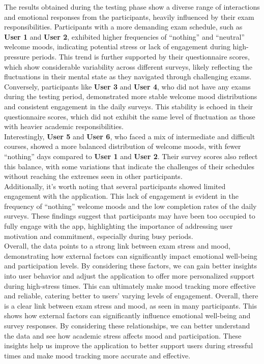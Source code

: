 The results obtained during the testing phase show a diverse range of interactions and emotional responses from the participants, heavily influenced by their exam responsibilities. Participants with a more demanding exam schedule, such as \textbf{User 1} and \textbf{User 2}, exhibited higher frequencies of ``nothing'' and ``neutral'' welcome moods, indicating potential stress or lack of engagement during high-pressure periods. This trend is further supported by their questionnaire scores, which show considerable variability across different surveys, likely reflecting the fluctuations in their mental state as they navigated through challenging exams.\vspace{5mm} \\
Conversely, participants like \textbf{User 3} and \textbf{User 4}, who did not have any exams during the testing period, demonstrated more stable welcome mood distributions and consistent engagement in the daily surveys. This stability is echoed in their questionnaire scores, which did not exhibit the same level of fluctuation as those with heavier academic responsibilities.\vspace{5mm} \\
Interestingly, \textbf{User 5} and \textbf{User 6}, who faced a mix of intermediate and difficult courses, showed a more balanced distribution of welcome moods, with fewer ``nothing'' days compared to \textbf{User 1} and \textbf{User 2}. Their survey scores also reflect this balance, with some variations that indicate the challenges of their schedules without reaching the extremes seen in other participants.\vspace{5mm} \\
Additionally, it’s worth noting that several participants showed limited engagement with the application. This lack of engagement is evident in the frequency of “nothing” welcome moods and the low completion rates of the daily surveys. These findings suggest that participants may have been too occupied to fully engage with the app, highlighting the importance of addressing user motivation and commitment, especially during busy periods.\vspace{5mm} \\
Overall, the data points to a strong link between exam stress and mood, demonstrating how external factors can significantly impact emotional well-being and participation levels. By considering these factors, we can gain better insights into user behavior and adjust the application to offer more personalized support during high-stress times. This can ultimately make mood tracking more effective and reliable, catering better to users’ varying levels of engagement.
Overall, there is a clear link between exam stress and mood, as seen in many participants. This shows how external factors can significantly influence emotional well-being and survey responses. By considering these relationships, we can better understand the data and see how academic stress affects mood and participation. These insights help us improve the application to better support users during stressful times and make mood tracking more accurate and effective.

